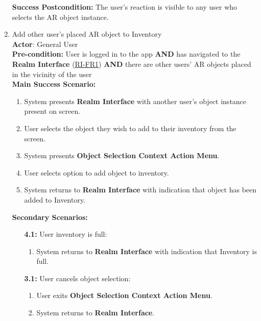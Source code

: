 \documentclass{article}
\begin{document}
\begin{enumerate}[label=\textbf{UC\arabic*}]
        \textbf{Success Postcondition:} The user’s reaction is visible to any user who selects the AR object instance.

    \item \label{uc:16} Add other user’s placed AR object to Inventory \\ 
        \textbf{Actor}: General User \\ 
        \textbf{Pre-condition:} User is logged in to the app \textbf{AND} has navigated to the \textbf{Realm Interface} (\hyperref[ssub:realm_interface]{RI-FR1}) \textbf{AND} there are other users’ AR objects placed in the vicinity of the user \\

        \textbf{Main Success Scenario:}
        \begin{enumerate}[label=\textbf{\arabic*.}]
            \item System presents \textbf{Realm Interface} with another user’s object instance present on screen.
            \item User selects the object they wish to add to their inventory from the screen.
            \item System presents \textbf{Object Selection Context Action Menu}.
            \item User selects option to add object to inventory.
            \item System returns to \textbf{Realm Interface} with indication that object has been added to Inventory.
        \end{enumerate}

        \textbf{Secondary Scenarios:}
        \begin{itemize}
            \item[{\bf 4.1:}] User inventory is full:
            \begin{enumerate}[label=\textbf{\arabic*.}]
                \item System returns to \textbf{Realm Interface} with indication that Inventory is full.
            \end{enumerate}

            \item[{\bf 3.1:}] User cancels object selection:
            \begin{enumerate}[label=\textbf{\arabic*.}]
                \item User exits \textbf{Object Selection Context Action Menu}.
                \item System returns to \textbf{Realm Interface}.
            \end{enumerate}
        \end{itemize}


\end{enumerate}
\end{document}
